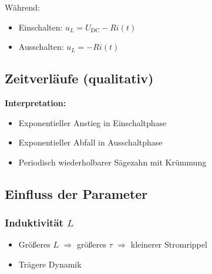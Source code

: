 Während:
\begin{itemize}
    \item Einschalten: $u_L = U_{\mathrm{DC}} - R i(t)$
    \item Ausschalten: $u_L = -R i(t)$
\end{itemize}

\subsection{Zeitverläufe (qualitativ)}

\begin{center}
\end{center}

\textbf{Interpretation:}
\begin{itemize}
    \item Exponentieller Anstieg in Einschaltphase
    \item Exponentieller Abfall in Ausschaltphase
    \item Periodisch wiederholbarer Sägezahn mit Krümmung
\end{itemize}

\subsection{Einfluss der Parameter}

\subsubsection{Induktivität $L$}
\begin{itemize}
    \item Größeres $L$ $\Rightarrow$ größeres $\tau$ $\Rightarrow$ kleinerer Stromrippel
    \item Trägere Dynamik
\end{itemize}

